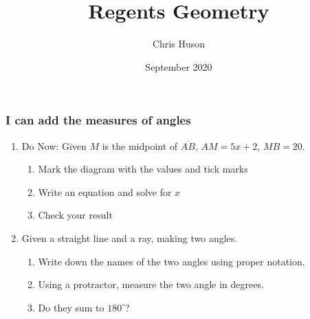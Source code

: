 \documentclass[12pt, twoside]{article}
\title{Regents Geometry}
\author{Chris Huson}
\date{September 2020}
\begin{document}
\subsubsection*{I can add the measures of angles}
\begin{enumerate}
  \item Do Now: Given $M$ is the midpoint of $\overline{AB}$, $AM=5x+2$, $MB=20$.
  \begin{enumerate}
    \item Mark the diagram with the values and tick marks
    \item Write an equation and solve for $x$
    \item Check your result
  \end{enumerate}
    \begin{center}
    \end{center} \vspace{2cm}

\item Given a straight line and a ray, making two angles.
  \begin{enumerate}[itemsep=0.5cm]
    \item Write down the names of the two angles using proper notation.
    \item Using a protractor, measure the two angle in degrees.
    \item Do they sum to $180^\circ$?
  \end{enumerate}
  \begin{center}
  \end{center}


\end{enumerate}
\end{document}
